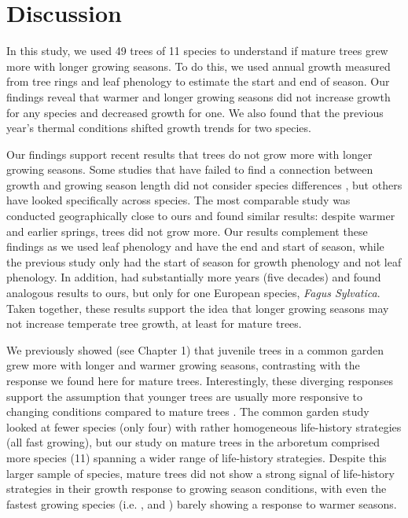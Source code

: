 \documentclass{article}\usepackage[]{graphicx}\usepackage[]{xcolor}
\begin{document}
\clearpage
\section{Discussion}
In this study, we used 49 trees of 11 species to understand if mature trees grew more with longer growing seasons. To do this, we used annual growth measured from tree rings and leaf phenology to estimate the start and end of season. Our findings reveal that warmer and longer growing seasons did not increase growth for any species and decreased growth for one. We also found that the previous year's thermal conditions shifted growth trends for two species. 

Our findings support recent results that trees do not grow more with longer growing seasons. Some studies that have failed to find a connection between growth and growing season length did not consider species differences \citep[e.g.,][]{cabon_water_2020}, but others have looked specifically across species. The most comparable study \citep[with eight species in common with our dataset;][]{dow_warm_2022} was conducted geographically close to ours and found similar results: despite warmer and earlier springs, trees did not grow more. Our results complement these findings as we used leaf phenology and have the end and start of season, while the previous study only had the start of season for growth phenology and not leaf phenology. In addition, \cite{cufar_variations_2015} had substantially more years (five decades) and found analogous results to ours, but only for one European species, \textit{Fagus Sylvatica}. Taken together, these results support the idea that longer growing seasons may not increase temperate tree growth, at least for mature trees. 

We previously showed (see Chapter 1) that juvenile trees in a common garden grew more with longer and warmer growing seasons, contrasting with the response we found here for mature trees. Interestingly, these diverging responses support the assumption that younger trees are usually more responsive to changing conditions compared to mature trees \citep{wolkovich_why_2025}. The common garden study looked at fewer species (only four) with rather homogeneous life-history strategies (all fast growing), but our study on mature trees in the arboretum comprised more species (11) spanning a wider range of life-history strategies. Despite this larger sample of species, mature trees did not show a strong signal of life-history strategies in their growth response to growing season conditions, with even the fastest growing species (i.e. {\Bnig}, {\Pdel} and {\Tame}) barely showing a response to warmer seasons.
\end{document}
